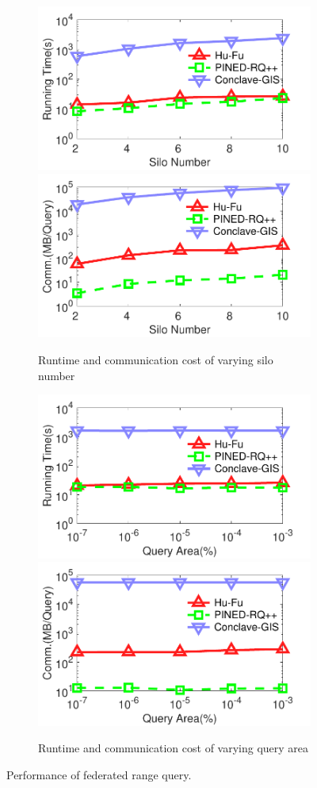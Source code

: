 \begin{figure}[t]
    \centering
    \begin{subfigure}{0.48\textwidth}
        \centering
        \includegraphics[width=0.48\linewidth]{traffic_rangequery_silo_time.pdf}
        \includegraphics[width=0.48\linewidth]{traffic_rangequery_silo_comm.pdf}
        \caption{Runtime and communication cost of varying silo number}
        \label{fig:symmetric-range-eff-silo-n}
    \end{subfigure}
    \begin{subfigure}{0.48\textwidth}
        \centering
        \includegraphics[width=0.48\linewidth]{traffic_rangequery_area_time.pdf}
        \includegraphics[width=0.48\linewidth]{traffic_rangequery_area_comm.pdf}
        \caption{Runtime and communication cost of varying query area}
        \label{fig:symmetric-range-eff-r-n}
    \end{subfigure}
    \caption{Performance of federated range query.}
    \label{fig:symmetric-range-eff}
\end{figure}

